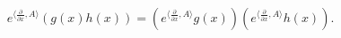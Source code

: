 \begin{equation}
\label{eq:transcomm}
  e^{\langle \frac{\partial}{\partial x}, A\rangle}(g(x)h(x)) =
  (e^{\langle \frac{\partial}{\partial x}, A\rangle} g(x))
  (e^{\langle \frac{\partial}{\partial x}, A\rangle} h(x)).
\end{equation}

